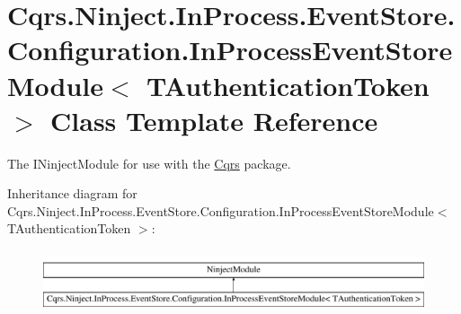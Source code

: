 \hypertarget{classCqrs_1_1Ninject_1_1InProcess_1_1EventStore_1_1Configuration_1_1InProcessEventStoreModule}{}\section{Cqrs.\+Ninject.\+In\+Process.\+Event\+Store.\+Configuration.\+In\+Process\+Event\+Store\+Module$<$ T\+Authentication\+Token $>$ Class Template Reference}
\label{classCqrs_1_1Ninject_1_1InProcess_1_1EventStore_1_1Configuration_1_1InProcessEventStoreModule}


The I\+Ninject\+Module for use with the \hyperlink{namespaceCqrs}{Cqrs} package.  


Inheritance diagram for Cqrs.\+Ninject.\+In\+Process.\+Event\+Store.\+Configuration.\+In\+Process\+Event\+Store\+Module$<$ T\+Authentication\+Token $>$\+:\begin{figure}[H]
\begin{center}
\leavevmode
\includegraphics[height=1.854305cm]{classCqrs_1_1Ninject_1_1InProcess_1_1EventStore_1_1Configuration_1_1InProcessEventStoreModule}
\end{center}
\end{figure}
